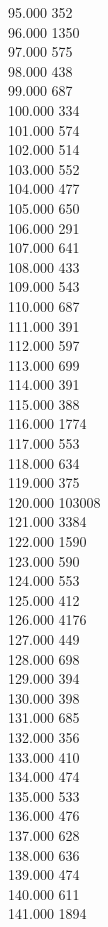 { 95.000	352 \\
 96.000	1350 \\
 97.000	575 \\
 98.000	438 \\
 99.000	687 \\
 100.000	334 \\
 101.000	574 \\
 102.000	514 \\
 103.000	552 \\
 104.000	477 \\
 105.000	650 \\
 106.000	291 \\
 107.000	641 \\
 108.000	433 \\
 109.000	543 \\
 110.000	687 \\
 111.000	391 \\
 112.000	597 \\
 113.000	699 \\
 114.000	391 \\
 115.000	388 \\
 116.000	1774 \\
 117.000	553 \\
 118.000	634 \\
 119.000	375 \\
 120.000	103008 \\
 121.000	3384 \\
 122.000	1590 \\
 123.000	590 \\
 124.000	553 \\
 125.000	412 \\
 126.000	4176 \\
 127.000	449 \\
 128.000	698 \\
 129.000	394 \\
 130.000	398 \\
 131.000	685 \\
 132.000	356 \\
 133.000	410 \\
 134.000	474 \\
 135.000	533 \\
 136.000	476 \\
 137.000	628 \\
 138.000	636 \\
 139.000	474 \\
 140.000	611 \\
 141.000	1894 \\
}
